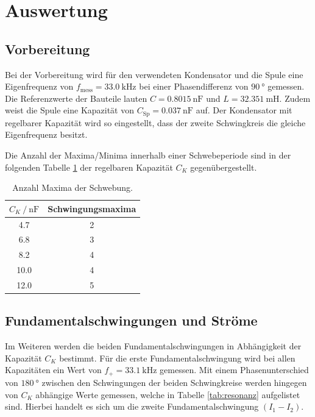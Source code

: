 \section{Auswertung}
\label{sec:Auswertung}

\subsection{Vorbereitung}
Bei der Vorbereitung wird für den verwendeten Kondensator und die Spule eine Eigenfrequenz von 
$f_{\text{mess}}=\SI{33.0}{\kilo\hertz}$ bei einer Phasendifferenz von $\SI{90}{\degree}$ gemessen. 
Die Referenzwerte der Bauteile lauten $C=\SI{0.8015}{\nano\farad}$ und $L=\SI{32.351}{\milli\henry}$. 
Zudem weist die Spule eine Kapazität von $C_\text{Sp}=\SI{0.037}{\nano\farad}$ auf.
Der Kondensator mit regelbarer Kapazität wird so eingestellt, dass der zweite Schwingkreis die gleiche Eigenfrequenz besitzt.

Die Anzahl der Maxima/Minima innerhalb einer Schwebeperiode sind in der folgenden Tabelle \ref{tab:schwing_maxima} der regelbaren Kapazität $C_K$ gegenübergestellt.

\begin{table}
    \centering
    \caption{Anzahl Maxima der Schwebung.}
    \label{tab:schwing_maxima}
    \begin{tabular}{c c}
        \toprule
        {$C_K \:/\: \si{\nano\farad}$} & Schwingungsmaxima \\
        \midrule
        4.7  & 2 \\ 
        6.8  & 3 \\ 
        8.2  & 4 \\ 
        10.0 & 4 \\ 
        12.0 & 5 \\ 
        \bottomrule
    \end{tabular}
\end{table}

\subsection{Fundamentalschwingungen und Ströme}
Im Weiteren werden die beiden Fundamentalschwingungen in Abhängigkeit der Kapazität $C_K$ bestimmt.
Für die erste Fundamentalschwingung wird bei allen Kapazitäten ein Wert von $f_+ = \SI{33.1}{\kilo\hertz}$ gemessen.
Mit einem Phasenunterschied von $\SI{180}{\degree}$ zwischen den Schwingungen der beiden Schwingkreise werden %
hingegen %
von $C_K$ abhängige Werte gemessen, welche in Tabelle \ref{tab:resonanz} aufgelistet sind.
Hierbei handelt es sich um die zweite Fundamentalschwingung ${(I_1 - I_2)}$.

